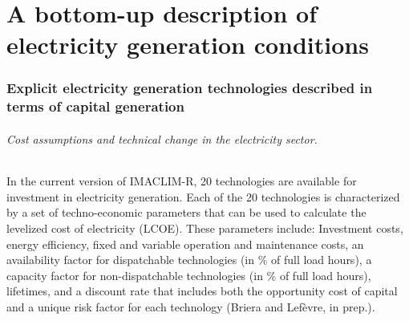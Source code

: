 \part*{A bottom-up description of electricity generation conditions}

\section{Explicit electricity generation technologies described in terms of capital generation}

\paragraph {Cost assumptions and technical change in the electricity sector.} In the current version of IMACLIM-R, 20 technologies are available for investment in electricity generation. Each of the 20 technologies is characterized by a set of techno-economic parameters that can be used to calculate the levelized cost of electricity (LCOE). These parameters include: Investment costs, energy efficiency, fixed and variable operation and maintenance costs, an availability factor for dispatchable technologies (in \% of full load hours), a capacity factor for non-dispatchable technologies (in \% of full load hours), lifetimes, and a discount rate that includes both the opportunity cost of capital and a unique risk factor for each technology (Briera and Lefèvre, in prep.).

